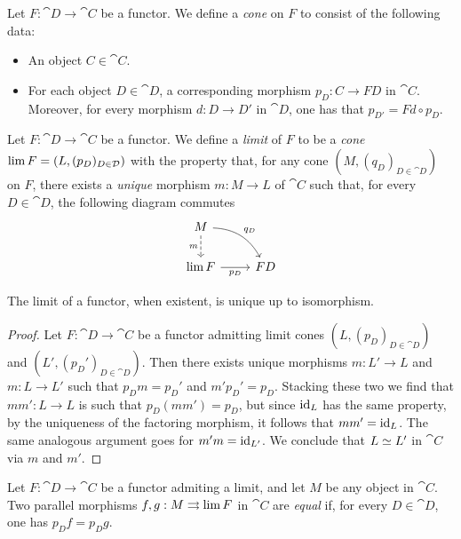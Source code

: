 \begin{definition}[Cone]
\label{def:cone-on-functor}
Let \(F: \cat D \to \cat C\) be a functor. We define a \emph{cone} on \(F\) to
consist of the following data:
\begin{itemize}\setlength\itemsep{0em}
\item An object \(C \in \cat C\).
\item For each object \(D \in \cat D\), a corresponding morphism \(p_D: C \to F
  D\) in \(\cat C\). Moreover, for every morphism \(d: D \to D'\) in \(\cat D\),
  one has that \(p_{D'} = F d \circ p_D\).
\end{itemize}
\end{definition}

\begin{definition}
\label{def:limit-of-functor}
Let \(F: \cat D \to \cat C\) be a functor. We define a \emph{limit} of \(F\) to
be a \emph{cone} \(\operatorname{lim} F = (L, (p_{D})_{D \in \mathcal D})\) with the property
that, for any cone \((M, (q_D)_{D \in \cat D})\) on \(F\), there exists a
\emph{unique} morphism \(m: M \to L\) of \(\cat C\) such that, for every
\(D \in \cat D\), the following diagram commutes
\[
\begin{tikzcd}
M \ar[d, dashed, "m"'] \ar[rd, bend left, "q_D"] & \\
\Lim F \ar[r, "p_D"'] &F D
\end{tikzcd}
\]
\end{definition}

\begin{proposition}[Uniqueness]
\label{prop:limit-functor-uniqueness}
The limit of a functor, when existent, is unique up to isomorphism.
\end{proposition}

\begin{proof}
Let \(F: \cat D \to \cat C\) be a functor admitting limit cones
\((L, (p_D)_{D \in \cat D})\) and \((L', (p_D')_{D \in \cat D})\). Then there
exists unique morphisms \(m: L' \to L\) and \(m: L \to L'\) such that
\(p_D m = p_D'\) and \(m' p_D' = p_D\). Stacking these two we find that
\(m m': L \to L\) is such that \(p_D (m m') = p_D\), but since \(\operatorname{id}_L\) has the
same property, by the uniqueness of the factoring morphism, it follows that
\(m m' = \operatorname{id}_L\). The same analogous argument goes for \(m' m = \operatorname{id}_{L'}\). We
conclude that \(L \simeq L'\) in \(\cat C\) via \(m\) and \(m'\).
\end{proof}

\begin{proposition}
\label{prop:equal-parallel-factorizations}
Let \(F: \cat D \to \cat C\) be a functor admiting a limit, and let \(M\) be any
object in \(\cat C\). Two parallel morphisms \(f, g: M \rightrightarrows \operatorname{lim} F\) in
\(\cat C\) are \emph{equal} if, for every \(D \in \cat D\), one has
\(p_D f = p_D g\).
\end{proposition}

